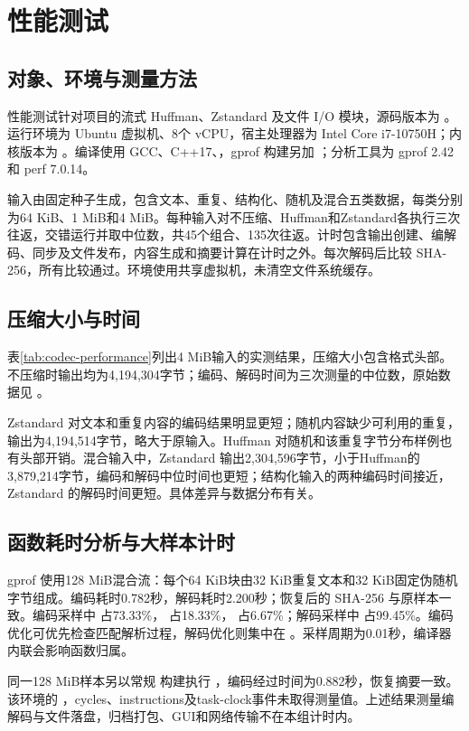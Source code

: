 \section{性能测试}
\subsection{对象、环境与测量方法}
性能测试针对项目的流式 Huffman、Zstandard 及文件 I/O 模块，源码版本为 。运行环境为 Ubuntu 虚拟机、8个 vCPU，宿主处理器为 Intel Core i7-10750H；内核版本为 。编译使用 GCC、C++17、，gprof 构建另加 ；分析工具为 gprof 2.42 和 perf 7.0.14。

输入由固定种子生成，包含文本、重复、结构化、随机及混合五类数据，每类分别为64 KiB、1 MiB和4 MiB。每种输入对不压缩、Huffman和Zstandard各执行三次往返，交错运行并取中位数，共45个组合、135次往返。计时包含输出创建、编解码、同步及文件发布，内容生成和摘要计算在计时之外。每次解码后比较 SHA-256，所有比较通过。环境使用共享虚拟机，未清空文件系统缓存。

\subsection{压缩大小与时间}
表\ref{tab:codec-performance}列出4 MiB输入的实测结果，压缩大小包含格式头部。不压缩时输出均为4,194,304字节；编码、解码时间为三次测量的中位数，原始数据见 。


Zstandard 对文本和重复内容的编码结果明显更短；随机内容缺少可利用的重复，输出为4,194,514字节，略大于原输入。Huffman 对随机和该重复字节分布样例也有头部开销。混合输入中，Zstandard 输出2,304,596字节，小于Huffman的3,879,214字节，编码和解码中位时间也更短；结构化输入的两种编码时间接近，Zstandard 的解码时间更短。具体差异与数据分布有关。

\subsection{函数耗时分析与大样本计时}
gprof 使用128 MiB混合流：每个64 KiB块由32 KiB重复文本和32 KiB固定伪随机字节组成。编码耗时0.782秒，解码耗时2.200秒；恢复后的 SHA-256 与原样本一致。编码采样中  占73.33\%， 占18.33\%， 占6.67\%；解码采样中  占99.45\%。编码优化可优先检查匹配解析过程，解码优化则集中在 。采样周期为0.01秒，编译器内联会影响函数归属。

同一128 MiB样本另以常规  构建执行 ，编码经过时间为0.882秒，恢复摘要一致。该环境的 ，cycles、instructions及task-clock事件未取得测量值。上述结果测量编解码与文件落盘，归档打包、GUI和网络传输不在本组计时内。

